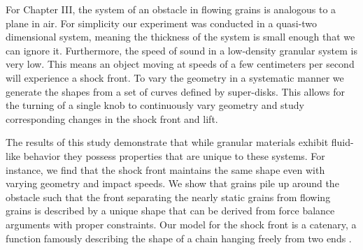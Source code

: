For Chapter III, the system of an obstacle in flowing grains is analogous to a plane in air. For simplicity our experiment was conducted in a quasi-two dimensional system, meaning the thickness of the system is small enough that we can ignore it. Furthermore, the speed of sound in a low-density granular system is very low. This means an object moving at speeds of a few centimeters per second will experience a shock front. To vary the geometry in a systematic manner we generate the shapes from a set of curves defined by super-disks. This allows for the turning of a single knob to continuously vary geometry and study corresponding changes in the shock front and lift. 

The results of this study demonstrate that while granular materials exhibit fluid-like behavior they possess properties that are unique to these systems. For instance, we find that the shock front maintains the same shape even with varying geometry and impact speeds. We show that grains pile up around the obstacle such that the front separating the nearly static grains from flowing grains is described by a unique shape that can be derived from force balance arguments with proper constraints. Our model for the shock front is a catenary, a function famously describing the shape of a chain hanging freely from two ends \cite{goldstein_classical_2002, mareno}. 